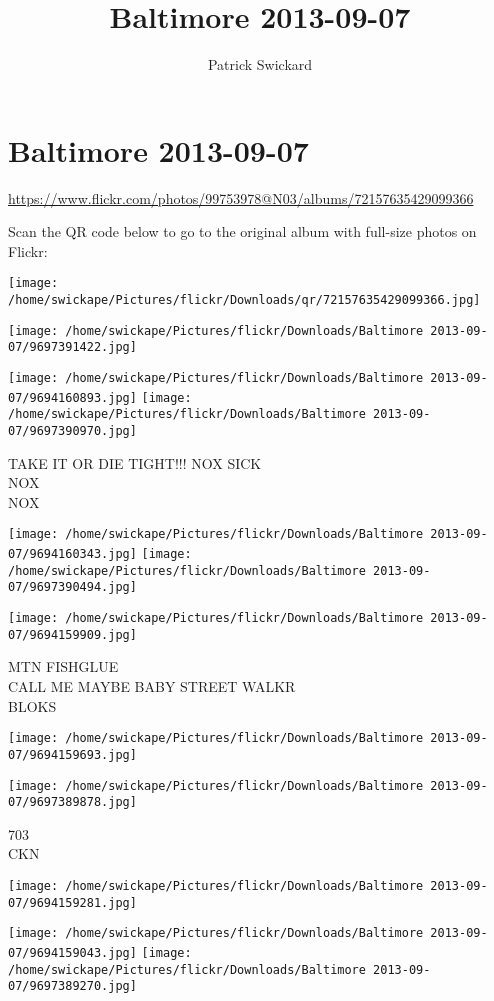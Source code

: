 \documentclass[10pt,letterpaper]{article}
\title{Baltimore 2013-09-07}
\author{Patrick Swickard}
\date{}
\begin{document}
\section*{Baltimore 2013-09-07}

\url{https://www.flickr.com/photos/99753978@N03/albums/72157635429099366}

Scan the QR code below to go to the original album with full-size photos on Flickr:

\texttt{[image: /home/swickape/Pictures/flickr/Downloads/qr/72157635429099366.jpg]}
\pagebreak

\texttt{[image: /home/swickape/Pictures/flickr/Downloads/Baltimore 2013-09-07/9697391422.jpg]}

\vspace{0.25in}
\texttt{[image: /home/swickape/Pictures/flickr/Downloads/Baltimore 2013-09-07/9694160893.jpg]}
\texttt{[image: /home/swickape/Pictures/flickr/Downloads/Baltimore 2013-09-07/9697390970.jpg]}

TAKE IT OR DIE TIGHT!!! NOX SICK\\
NOX\\
NOX
\pagebreak

\texttt{[image: /home/swickape/Pictures/flickr/Downloads/Baltimore 2013-09-07/9694160343.jpg]}
\texttt{[image: /home/swickape/Pictures/flickr/Downloads/Baltimore 2013-09-07/9697390494.jpg]}

\vspace{0.25in}
\texttt{[image: /home/swickape/Pictures/flickr/Downloads/Baltimore 2013-09-07/9694159909.jpg]}

MTN FISHGLUE\\
CALL ME MAYBE BABY STREET WALKR\\
BLOKS
\pagebreak

\texttt{[image: /home/swickape/Pictures/flickr/Downloads/Baltimore 2013-09-07/9694159693.jpg]}

\vspace{0.25in}
\texttt{[image: /home/swickape/Pictures/flickr/Downloads/Baltimore 2013-09-07/9697389878.jpg]}

703\\
CKN
\pagebreak

\texttt{[image: /home/swickape/Pictures/flickr/Downloads/Baltimore 2013-09-07/9694159281.jpg]}

\vspace{0.25in}
\texttt{[image: /home/swickape/Pictures/flickr/Downloads/Baltimore 2013-09-07/9694159043.jpg]}
\texttt{[image: /home/swickape/Pictures/flickr/Downloads/Baltimore 2013-09-07/9697389270.jpg]}
\end{document}
